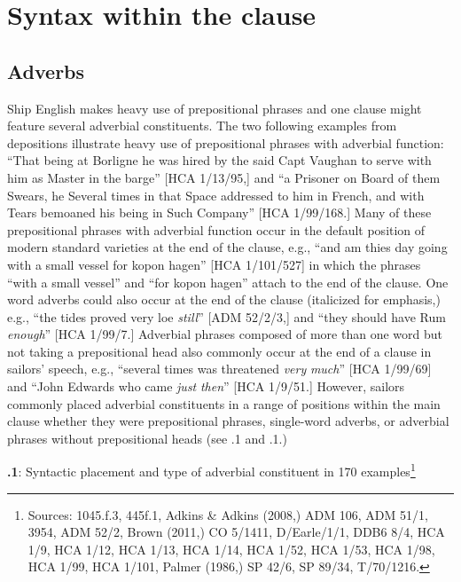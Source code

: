 \section{\textbf{Syntax} \textbf{within} \textbf{the} \textbf{clause}}%

\subsection{\textbf{Adverbs}}%

  Ship English makes heavy use of prepositional phrases and one clause might feature several adverbial constituents. The two following examples from depositions illustrate heavy use of prepositional phrases with adverbial function: “That being at Borligne he was hired by the said Capt Vaughan to serve with him as Master in the barge” [HCA 1/13/95,] and “a Prisoner on Board of them Swears, he Several times in that Space addressed to him in French, and with Tears bemoaned his being in Such Company” [HCA 1/99/168.] Many of these prepositional phrases with adverbial function occur in the default position of modern standard varieties at the end of the clause, e.g., “and am thies day going with a small vessel for kopon hagen” [HCA 1/101/527] in which the phrases “with a small vessel” and “for kopon hagen” attach to the end of the clause. One word adverbs could also occur at the end of the clause (italicized for emphasis,) e.g., “the tides proved very loe \textit{still}” [ADM 52/2/3,] and “they should have Rum \textit{enough}” [HCA 1/99/7.] Adverbial phrases composed of more than one word but not taking a prepositional head also commonly occur at the end of a clause in sailors’ speech, e.g., “several times was threatened \textit{very} \textit{much}” [HCA 1/99/69] and “John Edwards who came \textit{just} \textit{then}” [HCA 1/9/51.] However, sailors commonly placed adverbial constituents in a range of positions within the main clause whether they were prepositional phrases, single-word adverbs, or adverbial phrases without prepositional heads (see .1 and .1.) 

  
 

\textbf{.1}: Syntactic placement and type of adverbial constituent in 170 examples\footnote{Sources: 1045.f.3, 445f.1, Adkins \& Adkins (2008,) ADM 106, ADM 51/1, 3954, ADM 52/2, Brown (2011,)   CO 5/1411, D/Earle/1/1, DDB6 8/4, HCA 1/9, HCA 1/12, HCA 1/13, HCA 1/14, HCA 1/52, HCA 1/53, HCA 1/98, HCA 1/99, HCA 1/101, Palmer (1986,) SP 42/6, SP 89/34, T/70/1216.}

